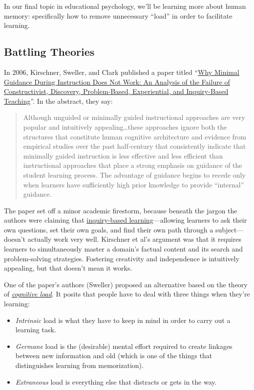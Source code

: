
In our final topic in educational psychology, we'll be learning more
about human memory: specifically how to remove unnecessary ``load'' in
order to facilitate learning.

\subsection{Battling Theories}\label{battling-theories}

In 2006, Kirschner, Sweller, and Clark published a paper titled
``\href{http://www.cogtech.usc.edu/publications/kirschner\_Sweller\_Clark.pdf}{Why
Minimal Guidance During Instruction Does Not Work: An Analysis of the
Failure of Constructivist, Discovery, Problem-Based, Experiential, and
Inquiry-Based Teaching}''. In the abstract, they say:

\begin{quote}
Although unguided or minimally guided instructional approaches are very
popular and intuitively appealing\ldots{}these approaches ignore both
the structures that constitute human cognitive architecture and evidence
from empirical studies over the past half-century that consistently
indicate that minimally guided instruction is less effective and less
efficient than instructional approaches that place a strong emphasis on
guidance of the student learning process. The advantage of guidance
begins to recede only when learners have sufficiently high prior
knowledge to provide ``internal'' guidance.
\end{quote}

The paper set off a minor academic firestorm, because beneath the jargon
the authors were claiming that
\href{https://en.wikipedia.org/wiki/Inquiry-based\_learning}{inquiry-based
learning}---allowing learners to ask their own questions, set their own
goals, and find their own path through a subject---doesn't actually work
very well. Kirschner et al's argument was that it requires learners to
simultaneously master a domain's factual content and its search and
problem-solving strategies. Fostering creativity and independence is
intuitively appealing, but that doesn't mean it works.

One of the paper's authors (Sweller) proposed an alternative based on
the theory of
\emph{\href{https://en.wikipedia.org/wiki/Cognitive\_load}{cognitive
load}}. It posits that people have to deal with three things when
they're learning:

\begin{itemize}
\item
  \emph{Intrinsic} load is what they have to keep in mind in order to
  carry out a learning task.
\item
  \emph{Germane} load is the (desirable) mental effort required to
  create linkages between new information and old (which is one of the
  things that distinguishes learning from memorization).
\item
  \emph{Extraneous} load is everything else that distracts or gets in
  the way.
\end{itemize}

